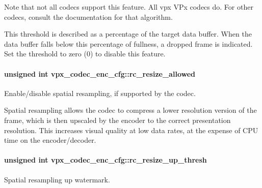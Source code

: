 Note that not all codecs support this feature. All vpx V\-Px codecs do. For other codecs, consult the documentation for that algorithm.

This threshold is described as a percentage of the target data buffer. When the data buffer falls below this percentage of fullness, a dropped frame is indicated. Set the threshold to zero (0) to disable this feature. \hypertarget{structvpx__codec__enc__cfg_a02a4e2f18fb0fdfff44df8b0d9a99d6c}{
\paragraph[{rc\-\_\-resize\-\_\-allowed}]{\setlength{\rightskip}{0pt plus 5cm}unsigned int vpx\-\_\-codec\-\_\-enc\-\_\-cfg\-::rc\-\_\-resize\-\_\-allowed}}\label{structvpx__codec__enc__cfg_a02a4e2f18fb0fdfff44df8b0d9a99d6c}


Enable/disable spatial resampling, if supported by the codec. 

Spatial resampling allows the codec to compress a lower resolution version of the frame, which is then upscaled by the encoder to the correct presentation resolution. This increases visual quality at low data rates, at the expense of C\-P\-U time on the encoder/decoder. \hypertarget{structvpx__codec__enc__cfg_a855599c0660f31dfcab4a64996b4f6ad}{
\paragraph[{rc\-\_\-resize\-\_\-up\-\_\-thresh}]{\setlength{\rightskip}{0pt plus 5cm}unsigned int vpx\-\_\-codec\-\_\-enc\-\_\-cfg\-::rc\-\_\-resize\-\_\-up\-\_\-thresh}}\label{structvpx__codec__enc__cfg_a855599c0660f31dfcab4a64996b4f6ad}


Spatial resampling up watermark. 

